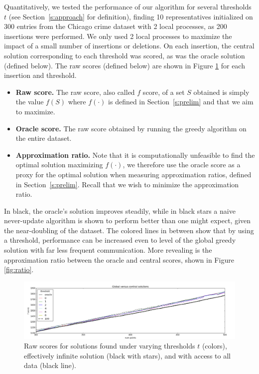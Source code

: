 Quantitatively, we tested the performance of our algorithm for several thresholds $t$ (see Section~\ref{s:approach} for definition), finding 10 representatives initialized on 300 entries from the Chicago crime dataset with 2 local processes, as 200 insertions were performed. We only used 2 local processes to maximize the impact of a small number of insertions or deletions. On each insertion, the central solution corresponding to each threshold was scored, as was the oracle solution (defined below). The raw scores (defined below) are shown in Figure \ref{fig:scores} for each insertion and threshold.
\begin{itemize}
\item \textbf{Raw score.} The raw score, also called $f$ score, of a set $S$ obtained is simply the value $f(S)$ where $f(\cdot)$ is defined in Section~\ref{s:prelim} and that we aim to maximize.

\item \textbf{Oracle score.} The raw score obtained by running the greedy algorithm on the entire dataset.

\item \textbf{Approximation ratio.} Note that it is computationally unfeasible to find the optimal solution maximizing $f(\cdot)$, we therefore use the oracle score as a proxy for the optimal solution when measuring approximation ratios, defined in Section~\ref{s:prelim}. Recall that we wish to minimize the approximation ratio.
\end{itemize}

In black, the oracle's solution improves steadily, while in black stars a naive never-update algorithm is shown to perform better than one might expect, given the near-doubling of the dataset. The colored lines in between show that by using a threshold, performance can be increased even to level of the global greedy solution with far less frequent communication. More revealing is the approximation ratio between the oracle and central scores, shown in Figure \ref{fig:ratio}.

\begin{figure}
    \centering
    \includegraphics[width=\linewidth]{scores}
    \caption{Raw scores for solutions found under varying thresholds $t$ (colors), effectively infinite solution (black with stars), and with access to all data (black line).}
    \label{fig:scores}
\end{figure}

